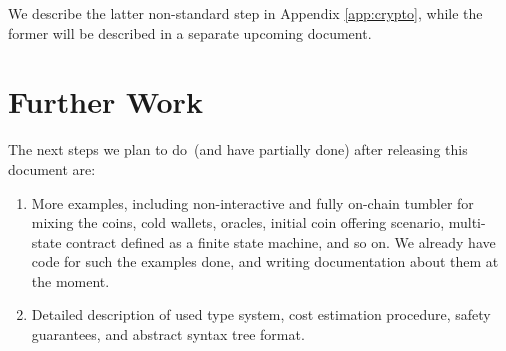 \documentclass[11pt]{article}
\begin{document}
We describe the latter non-standard step in Appendix \ref{app:crypto}, while the former will be described in a separate
upcoming document.

\section{Further Work}
\label{sec:further}

The next steps we plan to do~(and have partially done) after releasing this document are:
    \begin{enumerate}
        \item{} More examples, including non-interactive and fully on-chain tumbler for mixing the coins, cold wallets,
        oracles, initial coin offering scenario, multi-state contract defined as a finite state machine, and so on. We
        already have code for such the examples done, and writing documentation about them at the moment.
        \item{} Detailed description of used type system, cost estimation procedure, safety guarantees,
        and abstract syntax tree format.
    \end{enumerate}





\appendix
\end{document}
